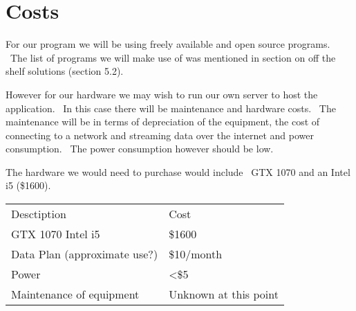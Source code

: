 \documentclass{scrreprt}
\begin{document}
\section{Costs}

{For our program we will be using freely available and open source
programs. ~The list of programs we will make use of was mentioned in
section on off the shelf solutions (section 5.2). }

{However for our hardware we may wish to run our own server to host the
application. ~In this case there will be maintenance and hardware costs.
~The maintenance will be in terms of depreciation of the equipment, the
cost of connecting to a network and streaming data over the internet and
power consumption. ~The power consumption however should be low.}

{The hardware we would need to purchase would include ~GTX 1070 and an
Intel i5 (\$1600).}

\begin{longtable}[c]{@{}ll@{}}
\toprule
\begin{minipage}[t]{0.47\columnwidth}\raggedright\strut
{Desctiption}
\strut\end{minipage} &
\begin{minipage}[t]{0.47\columnwidth}\raggedright\strut
{Cost}
\strut\end{minipage}\tabularnewline
\begin{minipage}[t]{0.47\columnwidth}\raggedright\strut
{GTX 1070 Intel i5}
\strut\end{minipage} &
\begin{minipage}[t]{0.47\columnwidth}\raggedright\strut
{\$1600}
\strut\end{minipage}\tabularnewline
\begin{minipage}[t]{0.47\columnwidth}\raggedright\strut
{Data Plan (approximate use?)}
\strut\end{minipage} &
\begin{minipage}[t]{0.47\columnwidth}\raggedright\strut
{\$10/month}
\strut\end{minipage}\tabularnewline
\begin{minipage}[t]{0.47\columnwidth}\raggedright\strut
{Power}
\strut\end{minipage} &
\begin{minipage}[t]{0.47\columnwidth}\raggedright\strut
{\textless{}\$5}
\strut\end{minipage}\tabularnewline
\begin{minipage}[t]{0.47\columnwidth}\raggedright\strut
{Maintenance of equipment}
\strut\end{minipage} &
\begin{minipage}[t]{0.47\columnwidth}\raggedright\strut
{Unknown at this point}
\strut\end{minipage}\tabularnewline
\bottomrule
\end{longtable}
\end{document}
